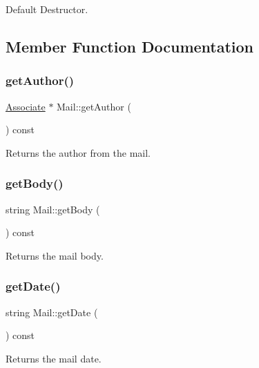 Default Destructor. 



\subsection{Member Function Documentation}
\mbox{\label{classMail_a23db9880d8a7d0fed31668b895fc3899}} 
\subsubsection{\texorpdfstring{get\+Author()}{getAuthor()}}
{\footnotesize\ttfamily \hyperlink{classAssociate}{Associate} $\ast$ Mail\+::get\+Author (\begin{DoxyParamCaption}{ }\end{DoxyParamCaption}) const}



Returns the author from the mail. 

\mbox{\label{classMail_af89b1b3d0f3c9d92a272c06f18fbdec3}} 
\subsubsection{\texorpdfstring{get\+Body()}{getBody()}}
{\footnotesize\ttfamily string Mail\+::get\+Body (\begin{DoxyParamCaption}{ }\end{DoxyParamCaption}) const}



Returns the mail body. 

\mbox{\label{classMail_ac45841e601864ec3f84566c3ee77de9a}} 
\subsubsection{\texorpdfstring{get\+Date()}{getDate()}}
{\footnotesize\ttfamily string Mail\+::get\+Date (\begin{DoxyParamCaption}{ }\end{DoxyParamCaption}) const}



Returns the mail date. 

